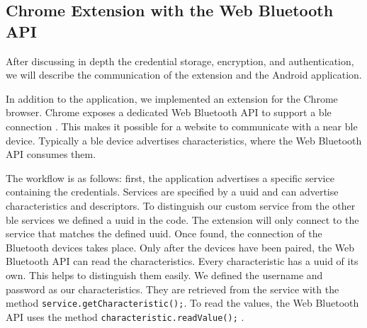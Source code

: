 
\subsection{Chrome Extension with the Web Bluetooth API}
After discussing in depth the credential storage, encryption, and authentication, we will describe the communication of the extension and the Android application.

In addition to the application, we implemented an extension for the Chrome browser. Chrome exposes a dedicated Web Bluetooth API to support a \gls{ble} connection \cite{WebBTAPI}. This makes it possible for a website to communicate with a near \gls{ble} device. Typically a \gls{ble} device advertises characteristics, where the Web Bluetooth API consumes them.

The workflow is as follows: first, the application advertises a specific service containing the credentials. Services are specified by a \gls{uuid} and can advertise characteristics and descriptors. To distinguish our custom service from the other \gls{ble} services we defined a \gls{uuid} in the code. The extension will only connect to the service that matches the defined \gls{uuid}. Once found, the connection of the Bluetooth devices takes place. Only after the devices have been paired, the Web Bluetooth API can read the characteristics. Every characteristic has a \gls{uuid} of its own. This helps to distinguish them easily. We defined the username and password as our characteristics. They are retrieved from the service with the method \texttt{service.getCharacteristic();}. To read the values, the Web Bluetooth API uses the method \texttt{characteristic.readValue();} \cite{WebBTAPI}.

